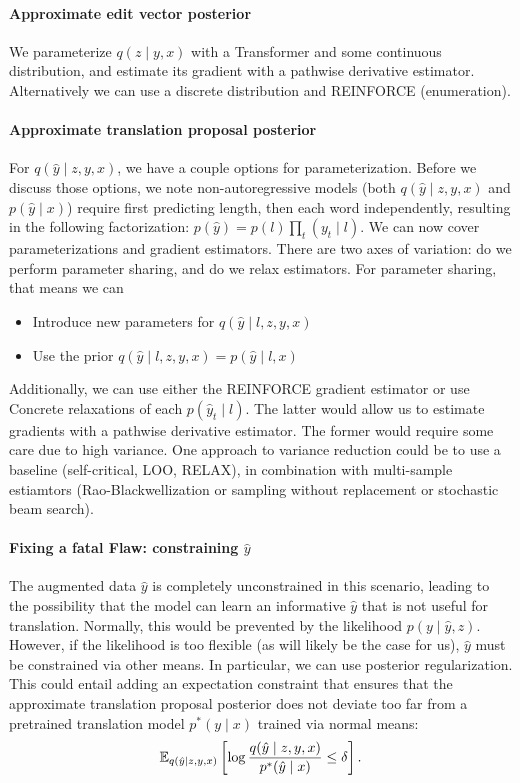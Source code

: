 \documentclass[11pt]{article}
\begin{document}
\paragraph{Approximate edit vector posterior}
We parameterize $q(z \mid y, x)$ with a Transformer and some continuous distribution,
and estimate its gradient with a pathwise derivative estimator.
Alternatively we can use a discrete distribution and REINFORCE (enumeration).

\paragraph{Approximate translation proposal posterior}
For $q(\hat{y} \mid z, y, x)$, we have a couple options for parameterization.
Before we discuss those options, we note non-autoregressive models (both $q(\hat{y}\mid z,y,x)$
and $p(\hat{y} \mid x)$) require first predicting length, then each word independently,
resulting in the following factorization: $p(\hat{y}) = p(l)\prod_t(y_t \mid l)$.
We can now cover parameterizations and gradient estimators.
There are two axes of variation: do we perform parameter sharing,
and do we relax estimators.
For parameter sharing, that means we can
\begin{itemize}
\item Introduce new parameters for $q(\hat{y} \mid l, z, y, x)$
\item Use the prior $q(\hat{y} \mid l, z, y, x) = p(\hat{y} \mid l, x)$
\end{itemize}
Additionally, we can use either the REINFORCE gradient estimator or
use Concrete relaxations of each $p(\hat{y}_t \mid l)$.
The latter would allow us to estimate gradients with a pathwise derivative estimator.
The former would require some care due to high variance.
One approach to variance reduction could be to use a baseline (self-critical, LOO, RELAX),
in combination with multi-sample estiamtors
(Rao-Blackwellization or sampling without replacement or stochastic beam search).

\paragraph{Fixing a fatal Flaw: constraining $\hat{y}$}
The augmented data $\hat{y}$ is completely unconstrained in this scenario,
leading to the possibility that the model can learn an informative $\hat{y}$
that is not useful for translation.
Normally, this would be prevented by the likelihood $p(y \mid \hat{y},z)$.
However, if the likelihood is too flexible (as will likely be the case for us),
$\hat{y}$ must be constrained via other means.
In particular, we can use posterior regularization.
This could entail adding an expectation constraint that ensures that the
approximate translation proposal posterior does not deviate too far from a pretrained
translation model $p^*(y \mid x)$ trained via normal means:
$$\mathbb{E}_{q(\hat{y} \mid z, y, x)}\left[ \log \frac{q(\hat{y} \mid z, y, x)}{p^*(\hat{y} \mid x)} \le \delta\right].$$
\end{document}
